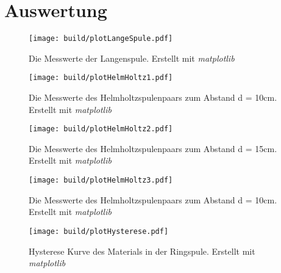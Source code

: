 \section{Auswertung}
\label{sec:Auswertung}

\begin{figure}
    \centering
    \caption{Die Messwerte der Langenspule. Erstellt mit \textit{matplotlib} \cite{matplotlib}}
    \label{fig:PlotLangeSpule}
    \texttt{[image: build/plotLangeSpule.pdf]}
\end{figure}

\begin{figure}
    \centering
    \caption{Die Messwerte des Helmholtzspulenpaars zum Abstand d = 10cm. Erstellt mit \textit{matplotlib} \cite{matplotlib}}
    \label{fig:PlotHH1}
    \texttt{[image: build/plotHelmHoltz1.pdf]}
\end{figure}

\begin{figure}
    \centering
    \caption{Die Messwerte des Helmholtzspulenpaars zum Abstand d = 15cm. Erstellt mit \textit{matplotlib} \cite{matplotlib}}
    \label{fig:PlotHH2}
    \texttt{[image: build/plotHelmHoltz2.pdf]}
\end{figure}

\begin{figure}
    \centering
    \caption{Die Messwerte des Helmholtzspulenpaars zum Abstand d = 10cm. Erstellt mit \textit{matplotlib} \cite{matplotlib}}
    \label{fig:PlotHH3}
    \texttt{[image: build/plotHelmHoltz3.pdf]}
\end{figure}

\begin{figure}
    \centering
    \caption{Hysterese Kurve des Materials in der Ringspule. Erstellt mit \textit{matplotlib} \cite{matplotlib}}
    \label{fig:PlotLangeSpule}
    \texttt{[image: build/plotHysterese.pdf]}
\end{figure}
